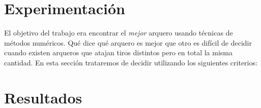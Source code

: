 \section{Experimentación}
El objetivo del trabajo era encontrar el \textit{mejor} arquero usando técnicas de métodos
numéricos. Qué dice qué arquero es mejor que otro es difícil de decidir cuando existen arqueros que
atajan tiros distintos pero en total la misma cantidad. En esta sección trataremos de decidir
utilizando los siguientes criterios:


\section{Resultados}


